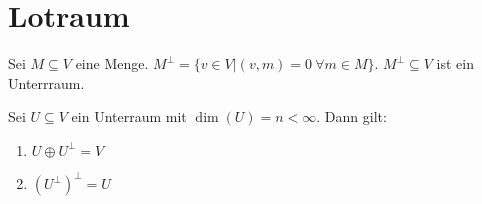 \section{Lotraum}
\begin{theorem}
Sei $M \subseteq V$ eine Menge. $M^\perp = \{v\in V | (v,m)=0~\forall m \in M\}$. $M^\perp \subseteq V$ ist ein Unterrraum.

Sei $U \subseteq V$ ein Unterraum mit $\dim(U) = n < \infty$. Dann gilt:
\begin{enumerate}
	\item $U \oplus U^\perp = V$
	\item $(U^\perp)^\perp = U$
\end{enumerate}
\end{theorem}
